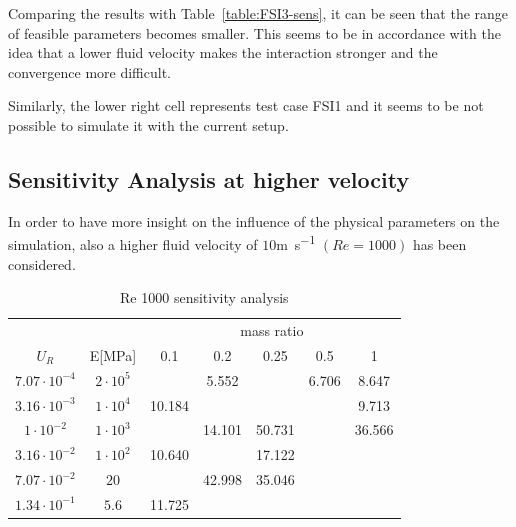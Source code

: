 Comparing the results with Table~\ref{table:FSI3-sens}, it can be seen that the range of feasible parameters becomes smaller. This seems to be in accordance with the idea that a lower fluid velocity makes the interaction stronger and the convergence more difficult.

Similarly, the lower right cell represents test case FSI1 and it seems to be not possible to simulate it with the current setup.


\subsection{Sensitivity Analysis at higher velocity}

In order to have more insight on the influence of the physical parameters on the simulation, also a higher fluid velocity of $10$\si{m.s^{-1}} $(Re=1000)$ has been considered.


%
\begin{table}[!htb]
	\begin{center}
		\begin{tabular}{ c | c | c c c c c |} 
			&  & \multicolumn{5}{c|}{mass ratio} \\
			
			$U_R$ & E[\si{MPa}] & 0.1 & 0.2 & 0.25 & 0.5 & 1 \\
			\hline
			
			$7.07\cdot 10^{-4}$ & $2\cdot 10^{5}$ & \cellcolor{green!10} & \cellcolor{green!10}5.552 & \cellcolor{green!10} & \cellcolor{green!10}6.706 & \cellcolor{green!10}8.647 \\
			$3.16\cdot 10^{-3}$ & $1\cdot 10^{4}$ & \cellcolor{green!10}10.184 & \cellcolor{green!10} & \cellcolor{green!10} & \cellcolor{green!10} & \cellcolor{green!10}9.713 \\        
			$1\cdot 10^{-2}$ & $1\cdot 10^{3}$ & \cellcolor{green!10} & \cellcolor{green!10}14.101 & \cellcolor{green!10}50.731 & \cellcolor{green!10} & \cellcolor{green!10}36.566 \\
			$3.16\cdot 10^{-2}$ & $1\cdot 10^{2}$ & \cellcolor{green!10}10.640 & \cellcolor{green!10} & \cellcolor{green!10}17.122 & \cellcolor{red!10} & \cellcolor{red!10} \\
			$7.07\cdot 10^{-2}$ & $20$ & \cellcolor{green!10} & \cellcolor{green!10}42.998 & \cellcolor{green!10}35.046 & \cellcolor{red!10} & \cellcolor{red!10} \\
			$1.34\cdot 10^{-1}$ & $5.6$ & \cellcolor{green!10}11.725 & \cellcolor{red!10} & \cellcolor{red!10} & \cellcolor{red!10} & \cellcolor{red!10} \\
			\hline                        
		\end{tabular}
	\end{center}
	\caption{Re 1000 sensitivity analysis}
	\label{table:Re1000-sens}
\end{table}

